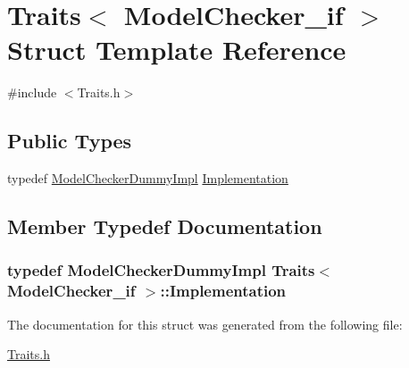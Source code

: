 \hypertarget{struct_traits_3_01_model_checker__if_01_4}{}\section{Traits$<$ Model\+Checker\+\_\+if $>$ Struct Template Reference}
\label{struct_traits_3_01_model_checker__if_01_4}


{\ttfamily \#include $<$Traits.\+h$>$}

\subsection*{Public Types}
\begin{DoxyCompactItemize}
\item 
typedef \hyperlink{class_model_checker_dummy_impl}{Model\+Checker\+Dummy\+Impl} \hyperlink{struct_traits_3_01_model_checker__if_01_4_a219c98d75eb287bd30dcfa2ce6e51200}{Implementation}
\end{DoxyCompactItemize}


\subsection{Member Typedef Documentation}
\subsubsection[{\texorpdfstring{Implementation}{Implementation}}]{\setlength{\rightskip}{0pt plus 5cm}typedef {\bf Model\+Checker\+Dummy\+Impl} {\bf Traits}$<$ {\bf Model\+Checker\+\_\+if} $>$\+::{\bf Implementation}}\hypertarget{struct_traits_3_01_model_checker__if_01_4_a219c98d75eb287bd30dcfa2ce6e51200}{}\label{struct_traits_3_01_model_checker__if_01_4_a219c98d75eb287bd30dcfa2ce6e51200}


The documentation for this struct was generated from the following file\+:\begin{DoxyCompactItemize}
\item 
\hyperlink{_traits_8h}{Traits.\+h}\end{DoxyCompactItemize}
